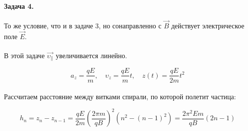 \documentclass[dvipdfmx]{article}
\begin{document}
\paragraph{Задача 4.}

То же условие, что и в задаче 3, но сонаправленно с $\vec{B}$ действует электрическое поле $\vec{E}$.

\paragraph{}

В этой задаче $\vec{\upsilon_\parallel}$ увеличивается линейно.

\begin{equation*}
  a_z = \frac{qE}{m}, \quad \upsilon_z = \frac{qE}{m}t, \quad z(t) = \frac{qE}{2m}t^2
\end{equation*}

\paragraph{}

\newpage

Рассчитаем расстояние между витками спирали, по которой полетит частица:

\begin{equation*}
  h_n = z_n - z_{n-1} = \frac{qE}{2m}\left(\frac{2\pi m}{qB}\right)^2\left(n^2-(n-1)^2\right) = \frac{2\pi^2Em}{qB}(2n-1)
\end{equation*}
\end{document}
